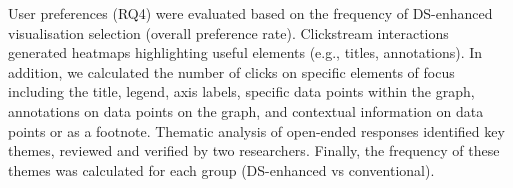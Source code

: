 User preferences (RQ4) were evaluated based on the frequency of DS-enhanced visualisation selection (overall preference rate). Clickstream interactions generated heatmaps highlighting useful elements (e.g., titles, annotations).  In addition, we calculated the number of clicks on specific elements of focus including the title, legend, axis labels, specific data points within the graph, annotations on data points on the graph, and contextual information on data points or as a footnote. Thematic analysis of open-ended responses identified key themes, reviewed and verified by two researchers. Finally, the frequency of these themes was calculated for each group (DS-enhanced vs conventional). 

